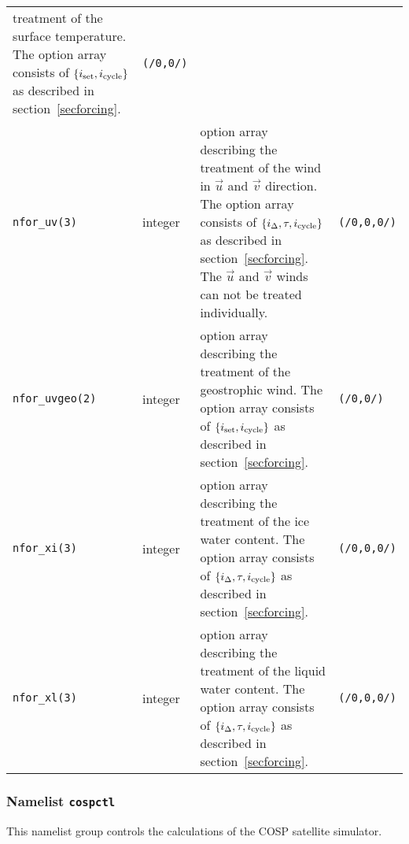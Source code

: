 \begin{longtable}{l@{\extracolsep\fill}lp{5.0cm}p{3.0cm}}
treatment of the surface temperature. The option array consists of
$\{i_{\rm set},i_{\rm cycle}\}$ as described in section~\ref{secforcing}. & {\tt (/0,0/)} \\
{\tt nfor\_uv(3)}\index{namelist variables!nfor\_uv}
       &integer   &option array describing the
treatment of the wind in $\vec{u}$ and $\vec{v}$ direction. The option array consists of
$\{i_\Delta,\tau,i_{\rm cycle}\}$ as described in section~\ref{secforcing}. The $\vec{u}$
and $\vec{v}$ winds can not be treated individually.
                                 &   {\tt (/0,0,0/)}  \\ 
{\tt nfor\_uvgeo(2)}\index{namelist variables!nfor\_uvgeo}
       &integer & option array describing the
treatment of the geostrophic wind. The option array consists of
$\{i_{\rm set},i_{\rm cycle}\}$ as described in section~\ref{secforcing}. & {\tt (/0,0/)} \\
{\tt nfor\_xi(3)}\index{namelist variables!nfor\_xi}
       &integer   & option array describing the
treatment of the ice water content. The option array consists of
$\{i_\Delta,\tau,i_{\rm cycle}\}$ as described in section~\ref{secforcing}.
                                 &   {\tt (/0,0,0/)}  \\ 
{\tt nfor\_xl(3)}\index{namelist variables!nfor\_xl}
       &integer   & option array describing the
treatment of the liquid water content. The option array consists of
$\{i_\Delta,\tau,i_{\rm cycle}\}$ as described in section~\ref{secforcing}.
                                 &   {\tt (/0,0,0/)}  \\ 
\hline 
\end{longtable}


\subsubsection{Namelist {\tt cospctl}}\label{seccospctl}

This namelist group controls the calculations of the COSP satellite
simulator.

\setlength{\LTcapwidth}{\textwidth}
\setlength{\LTleft}{0pt}\setlength{\LTright}{0pt}

